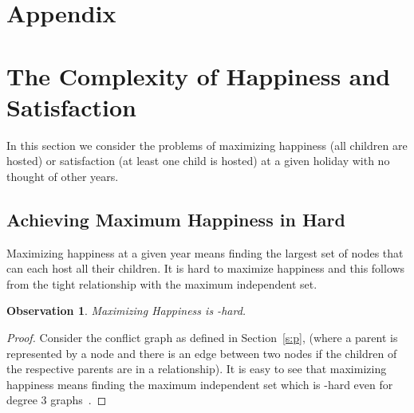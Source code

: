 \documentclass[11pt]{article}
\newtheorem{observation}[theorem]{Observation}
\begin{document}



\appendix
\section*{Appendix}

\section{The Complexity of Happiness and Satisfaction} \label{a:deluge}

In this section we consider the problems of maximizing happiness (all children are hosted) or
satisfaction (at least one child is hosted) at a given holiday with no thought of other years.

\subsection{Achieving Maximum Happiness in Hard}\label{ss:max}

Maximizing happiness at a given year means finding the largest set of nodes that can each host all their children.
It is hard to maximize happiness and this follows from the tight relationship with the maximum independent set.

\begin{observation}\label{t:ind}
Maximizing Happiness is -hard.
\end{observation}

\begin{proof} Consider the conflict graph  as defined in Section~\ref{s:p},
(where a parent is represented by a node and there is an edge between two nodes if the children of the respective parents are
in a relationship).
It is easy to see that maximizing happiness means finding the maximum
independent set which is -hard
even for degree 3 graphs~\cite{bf:95}.
\end{proof}
\end{document}
